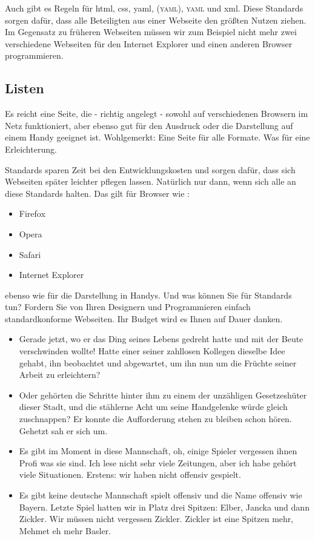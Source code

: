 Auch gibt es Regeln für \gls{html}, \gls{css}, \gls{yaml},
\textsc{(yaml)}, \textsc{yaml} und \gls{xml}. Diese Standards sorgen
dafür, dass alle Beteiligten aus einer Webseite den größten Nutzen
ziehen. Im Gegensatz zu früheren Webseiten müssen wir zum Beispiel
nicht mehr zwei verschiedene Webseiten für den Internet Explorer und
einen anderen Browser programmieren.

\hypertarget{listen}{%
\subsection{Listen}\label{listen}}

Es reicht eine Seite, die - richtig angelegt - sowohl auf
verschiedenen Browsern im Netz funktioniert, aber ebenso gut für den
Ausdruck oder die Darstellung auf einem Handy geeignet ist.
Wohlgemerkt: Eine Seite für alle Formate. Was für eine
Erleichterung.

Standards sparen Zeit bei den Entwicklungskosten und sorgen dafür,
dass sich Webseiten später leichter pflegen lassen. Natürlich nur
dann, wenn sich alle an diese Standards halten. Das gilt für Browser
wie \autocite[vgl.][10-15]{Al-Rfou_TheanoPython_2016}:

\begin{itemize}
\tightlist
\item
  Firefox
\item
  Opera
\item
  Safari
\item
  Internet Explorer
\end{itemize}

ebenso wie für die Darstellung in Handys. Und was können Sie für
Standards tun? Fordern Sie von Ihren Designern und Programmieren
einfach standardkonforme Webseiten. Ihr Budget wird es Ihnen auf
Dauer danken.

\begin{itemize}
\item
  Gerade jetzt, wo er das Ding seines Lebens gedreht hatte und mit
  der Beute verschwinden wollte! Hatte einer seiner zahllosen
  Kollegen dieselbe Idee gehabt, ihn beobachtet und abgewartet, um
  ihn nun um die Früchte seiner Arbeit zu erleichtern?
\item
  Oder gehörten die Schritte hinter ihm zu einem der unzähligen
  Gesetzeshüter dieser Stadt, und die stählerne Acht um seine
  Handgelenke würde gleich zuschnappen? Er konnte die Aufforderung
  stehen zu bleiben schon hören. Gehetzt sah er sich um.
\item
  Es gibt im Moment in diese Mannschaft, oh, einige Spieler
  vergessen ihnen Profi was sie sind. Ich lese nicht sehr viele
  Zeitungen, aber ich habe gehört viele Situationen. Erstens: wir
  haben nicht offensiv gespielt.
\item
  Es gibt keine deutsche Mannschaft spielt offensiv und die Name
  offensiv wie Bayern. Letzte Spiel hatten wir in Platz drei
  Spitzen: Elber, Jancka und dann Zickler. Wir müssen nicht
  vergessen Zickler. Zickler ist eine Spitzen mehr, Mehmet eh mehr
  Basler.
\end{itemize}

